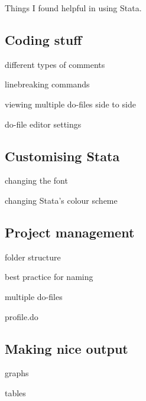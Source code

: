 Things I found helpful in using Stata.

\subsection{Coding stuff}

different types of comments

linebreaking commands

viewing multiple do-files side to side

do-file editor settings

\subsection{Customising Stata}

changing the font

changing Stata's colour scheme

\subsection{Project management}

folder structure

best practice for naming

multiple do-files

profile.do

\subsection{Making nice output}

graphs

tables
